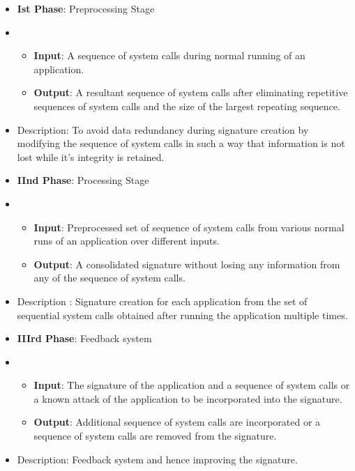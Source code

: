 \begin{itemize}
    \item[] \textbf{Ist Phase}: Preprocessing Stage
    \item[] \begin{itemize}
                \item[] \textbf{Input}: A sequence of system calls during normal running of an application. 
                \item[] \textbf{Output}: A resultant sequence of system calls after eliminating repetitive sequences of system calls and the size of the largest repeating sequence.
            \end{itemize}
    \item[] Description: To avoid data redundancy during signature creation by modifying the sequence of system calls in such a way that information is not lost while it's integrity is retained.

    \item[] \textbf{IInd Phase}: Processing Stage
    \item[] \begin{itemize}
                \item[] \textbf{Input}: Preprocessed set of sequence of system calls from various normal runs of an application over different inputs.
                \item[] \textbf{Output}: A consolidated signature without losing any information from any of the sequence of system calls.
            \end{itemize}
    \item[] Description : Signature creation for each application from the set of sequential system calls obtained after running the application multiple times.    
    \item[] \textbf{IIIrd Phase}: Feedback system
    \item[] \begin{itemize}
                \item[] \textbf{Input}: The signature of the application and a sequence of system calls or a known attack of the application to be incorporated into the signature.
                \item[] \textbf{Output}: Additional sequence of system calls are incorporated or a sequence of system calls are removed from the signature.
            \end{itemize}
    \item[] Description: Feedback system and hence improving the signature.


\end{itemize}
